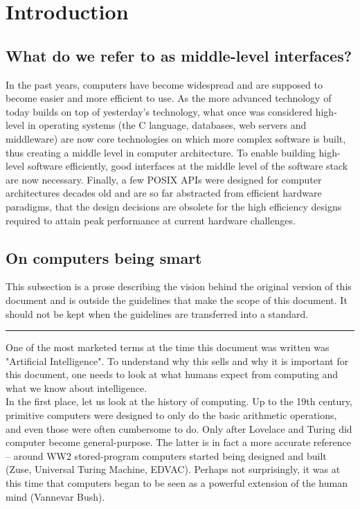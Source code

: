 \section{Introduction}
\subsection{What do we refer to as middle-level interfaces?}
In the past years, computers have become widespread and are supposed to become easier and more efficient to use. As the more advanced technology of today builds on top of yesterday's technology, what once was considered high-level in operating systems (the C language, databases, web servers and middleware) are now core technologies on which more complex software is built, thus creating a middle level in computer architecture. To enable building high-level software efficiently, good interfaces at the middle level of the software stack are now necessary. Finally, a few POSIX APIs were designed for computer architectures decades old and are so far abstracted from efficient hardware paradigms, that the design decisions are obsolete for the high efficiency designs required to attain peak performance at current hardware challenges.
\subsection{On computers being smart}
This subsection is a prose describing the vision behind the original version of this document and is outside the guidelines that make the scope of this document. It should not be kept when the guidelines are transferred into a standard.\\
\hrule\quad

One of the most marketed terms at the time this document was written was "Artificial Intelligence". To understand why this sells and why it is important for this document, one needs to look at what humans expect from computing and what we know about intelligence.\\

In the first place, let us look at the history of computing. Up to the 19th century, primitive computers were designed to only do the basic arithmetic operations, and even those were often cumbersome to do. Only after Lovelace and Turing did computer become general-purpose. The latter is in fact a more accurate reference -- around WW2 stored-program computers started being designed and built (Zuse, Universal Turing Machine, EDVAC). Perhaps not surprisingly, it was at this time that computers began to be seen as a powerful extension of the human mind (Vannevar Bush).\\

